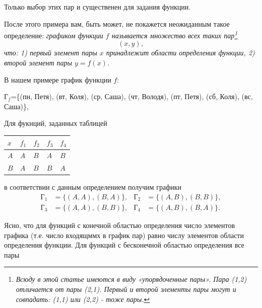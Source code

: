 \documentclass[8pt,twocolumn]{article}
\begin{document}
Только выбор этих пар и существенен для задания функции. 

После этого примера вам, быть может, не покажется неожиданным такое определение: \emph{графиком функции $f$ называется множество всех таких пар\footnote{\emph{Всюду в этой статье имеются в виду «упорядоченные пары». Пара (1,2) отличается от пары (2,1). Первый и второй элементы пары могут и совпадать: (1,1) или (2,2) - тоже пары.}}}
\[
(x,y),
\]
\emph{что: 1) первый элемент пары $x$ принадлежит области определения функции, 2) второй элемент пары $y=f(x)$.}

В нашем примере график функции $f$:

Г$_{f}$=\{(пн, Петя), (вт, Коля), (ср, Саша), (чт, Володя), (пт, Петя), (сб, Коля), (вс, Саша)\},

Для фукнций, заданных таблицей

\vspace{-0.6\baselineskip}
\begin{center}
\setlength{\tabcolsep}{6pt}
\renewcommand{\arraystretch}{1.15}
\begin{tabularx}{\linewidth}{|Y|Y|Y|Y|Y|}
\hline
$x$ & $f_1$ & $f_2$ & $f_3$ & $f_4$ \\ \hline
$A$ & $A$   & $B$   & $A$   & $B$   \\ \hline
$B$ & $A$   & $B$   & $B$   & $A$   \\ \hline
\end{tabularx}
\end{center}
\vspace{-0.4\baselineskip}
в соответствии с данным определением получим графики
\[
\begin{aligned}
\text{Г}_{1}&=\{(A,A),(B,A)\}, & \text{Г}_{2}&=\{(A,B),(B,B)\},\\
\text{Г}_{3}&=\{(A,A),(B,B)\}, & \text{Г}_{4}&=\{(A,B),(B,A)\}.
\end{aligned}
\]


Ясно, что для функций с конечной областью определения число элементов графика (т.е. число входящммх в график пар) равно числу элементов области определения функции. Для функций с бесконечной областью определения все пары
\end{document}
